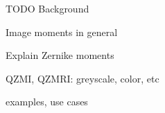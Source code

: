 TODO Background

Image moments in general

Explain Zernike moments

QZMI, QZMRI:
greyscale, color, etc

examples, use cases
